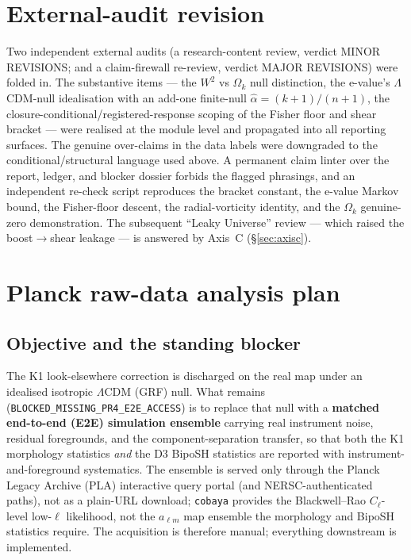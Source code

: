 \documentclass[11pt]{article}
\newcommand{\code}[1]{\texttt{\small #1}}
\newcommand{\Wsq}{W^2}
\newcommand{\Ok}{\Omega_{k}}
\begin{document}
\section{External-audit revision}\label{sec:audit}

Two independent external audits (a research-content review, verdict MINOR
REVISIONS; and a claim-firewall re-review, verdict MAJOR REVISIONS) were folded
in. The substantive items --- the $\Wsq$ vs $\Ok$ null distinction, the
e-value's $\Lambda$CDM-null idealisation with an add-one finite-null
$\hat\alpha=(k{+}1)/(n{+}1)$, the closure-conditional/registered-response
scoping of the Fisher floor and shear bracket --- were realised at the module
level and propagated into all reporting surfaces. The genuine over-claims in the
data labels were downgraded to the conditional/structural language used above. A
permanent claim linter over the report, ledger, and blocker dossier forbids the
flagged phrasings, and an independent re-check script reproduces the bracket
constant, the e-value Markov bound, the Fisher-floor descent, the
radial-vorticity identity, and the $\Ok$ genuine-zero demonstration. The
subsequent ``Leaky Universe'' review --- which raised the boost$\to$shear
leakage --- is answered by Axis~C (\S\ref{sec:axisc}).

\section{Planck raw-data analysis plan}\label{sec:plan}

\subsection{Objective and the standing blocker}
The K1 look-elsewhere correction is discharged on the real map under an
idealised isotropic $\Lambda$CDM (GRF) null. What remains
(\code{BLOCKED\_MISSING\_PR4\_E2E\_ACCESS}) is to replace that null with a
\textbf{matched end-to-end (E2E) simulation ensemble} carrying real instrument
noise, residual foregrounds, and the component-separation transfer, so that both
the K1 morphology statistics \emph{and} the D3 BipoSH statistics are reported
with instrument-and-foreground systematics. The ensemble is served only through
the Planck Legacy Archive (PLA) interactive query portal (and
NERSC-authenticated paths), not as a plain-URL download; \code{cobaya} provides
the Blackwell--Rao $C_\ell$-level low-$\ell$ likelihood, not the $a_{\ell m}$ map
ensemble the morphology and BipoSH statistics require. The acquisition is
therefore manual; everything downstream is implemented.
\end{document}
